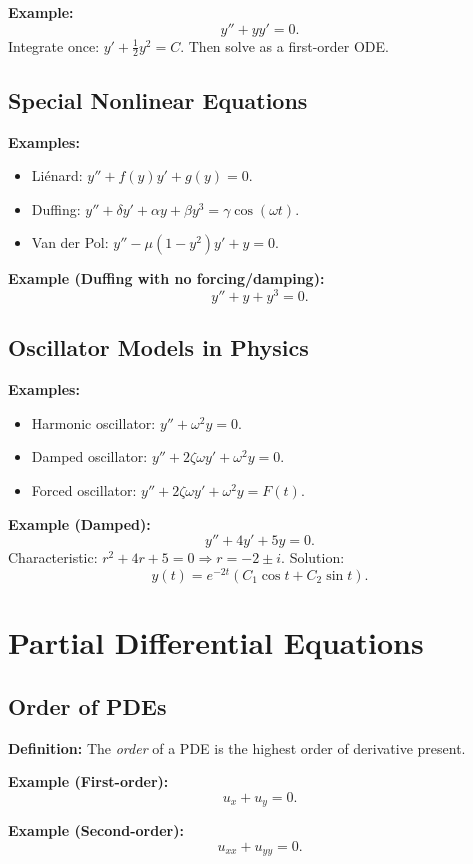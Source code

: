 \documentclass[12pt]{book}
\begin{document}
\textbf{Example:}
\[
y'' + y y' = 0.
\]
Integrate once: $y' + \tfrac{1}{2}y^2 = C$. Then solve as a first-order ODE.

\chapter{Special Nonlinear Equations}
\textbf{Examples:}
\begin{itemize}
  \item Liénard: $y'' + f(y)y' + g(y)=0$.
  \item Duffing: $y'' + \delta y' + \alpha y + \beta y^3 = \gamma \cos(\omega t)$.
  \item Van der Pol: $y'' - \mu(1-y^2)y' + y = 0$.
\end{itemize}

\textbf{Example (Duffing with no forcing/damping):}
\[
y'' + y + y^3 = 0.
\]

\chapter{Oscillator Models in Physics}
\textbf{Examples:}
\begin{itemize}
  \item Harmonic oscillator: $y'' + \omega^2 y = 0$.
  \item Damped oscillator: $y'' + 2\zeta \omega y' + \omega^2 y = 0$.
  \item Forced oscillator: $y'' + 2\zeta \omega y' + \omega^2 y = F(t)$.
\end{itemize}

\textbf{Example (Damped):}
\[
y'' + 4 y' + 5 y = 0.
\]
Characteristic: $r^2+4r+5=0 \Rightarrow r=-2 \pm i$.  
Solution:
\[
y(t)=e^{-2t}(C_1\cos t + C_2\sin t).
\]

\backmatter

\part{Partial Differential Equations}

\chapter{Order of PDEs}
\textbf{Definition:} The \emph{order} of a PDE is the highest order of derivative present.

\textbf{Example (First-order):}
\[
u_x + u_y = 0.
\]

\textbf{Example (Second-order):}
\[
u_{xx} + u_{yy} = 0.
\]
\end{document}
